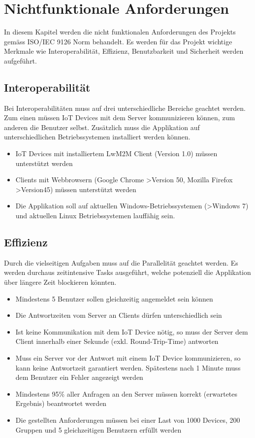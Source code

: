\section{Nichtfunktionale Anforderungen}
In diesem Kapitel werden die nicht funktionalen Anforderungen des Projekts gemäss ISO/IEC 9126 Norm behandelt. Es werden für das Projekt wichtige Merkmale wie Interoperabilität, Effizienz, Benutzbarkeit und Sicherheit werden aufgeführt. 

\subsection{Interoperabilität}
Bei Interoperabilitäten muss auf drei unterschiedliche Bereiche geachtet werden. Zum einen müssen IoT Devices mit dem Server kommunizieren können, zum anderen die Benutzer selbst. Zusätzlich muss die Applikation auf unterschiedlichen Betriebssystemen installiert werden können.

\begin{itemize}
\item IoT Devices mit installiertem LwM2M Client (Version 1.0) müssen unterstützt werden
\item Clients mit Webbrowsern (Google Chrome >Version 50, Mozilla Firefox >Version45) müssen unterstützt werden
\item Die Applikation soll auf aktuellen Windows-Betriebssystemen (>Windows 7) und aktuellen Linux Betriebssystemen lauffähig sein. 
\end{itemize}

\subsection{Effizienz}
Durch die vielseitigen Aufgaben muss auf die Parallelität geachtet werden. Es werden durchaus zeitintensive Tasks ausgeführt, welche potenziell die Applikation über längere Zeit blockieren könnten.

\begin{itemize}
\item Mindestens 5 Benutzer sollen gleichzeitig angemeldet sein können
\item Die Antwortzeiten vom Server an Clients dürfen unterschiedlich sein  
\item Ist keine Kommunikation mit dem IoT Device nötig, so muss der Server dem Client innerhalb einer Sekunde (exkl. Round-Trip-Time) antworten
\item Muss ein Server vor der Antwort mit einem IoT Device kommunizieren, so kann keine Antwortzeit garantiert werden. Spätestens nach 1 Minute muss dem Benutzer ein Fehler angezeigt werden
\item Mindestens 95\% aller Anfragen an den Server müssen korrekt (erwartetes Ergebnis) beantwortet werden
\item Die gestellten Anforderungen müssen bei einer Last von 1000 Devices, 200 Gruppen und 5 gleichzeitigen Benutzern erfüllt werden
\end{itemize}
\newpage
